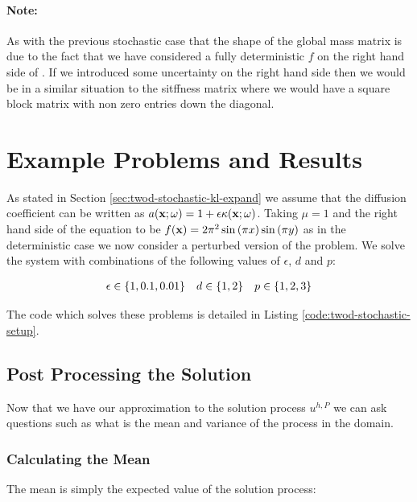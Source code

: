\paragraph{Note:}

As with the previous stochastic case that the shape of the global mass matrix
is due to the fact that we have considered a fully deterministic $f$ on the
right hand side of . If we introduced some uncertainty
on the right hand side then we would be in a similar situation to the sitffness
matrix where we would have a square block matrix with non zero entries down the
diagonal.

\section{Example Problems and Results}

As stated in Section \ref{sec:twod-stochastic-kl-expand} we assume that the
diffusion coefficient can be written as $a(\mathbf{x};\omega) = 1 +
\epsilon\kappa(\mathbf{x};\omega)$. Taking $\mu = 1$ and the right hand side of the
equation to be $f(\mathbf{x}) = 2\pi^2\sin{(\pi x)}\sin{(\pi y)}$ as in the
deterministic case we now consider a perturbed version of the problem. We solve
the system with combinations of the following values of $\epsilon$, $d$ and
$p$:

\begin{equation*}
    \begin{array}{c c c}
        \epsilon \in \{1, 0.1, 0.01\} &
        d \in \{1, 2\} &
        p \in \{1, 2, 3\}
    \end{array}
\end{equation*}

The code which solves these problems is detailed in Listing
\ref{code:twod-stochastic-setup}.

\subsection{Post Processing the Solution}

Now that we have our approximation to the solution process $u^{h,P}$ we can ask
questions such as what is the mean and variance of the process in the domain.

\subsubsection{Calculating the Mean}

The mean is simply the expected value of the solution process:

